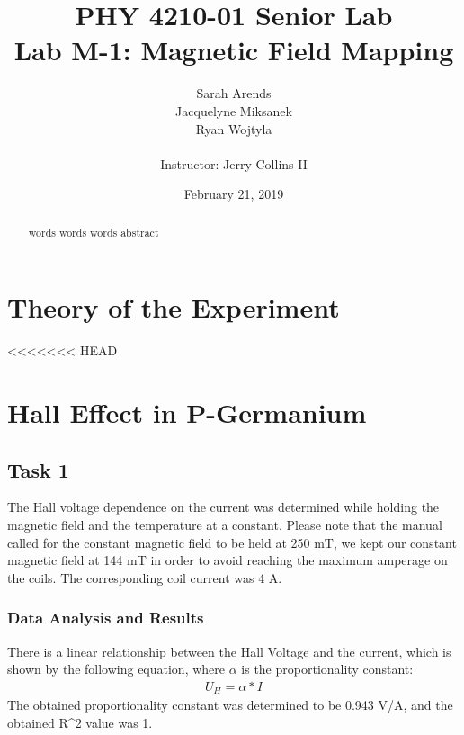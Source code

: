 \documentclass[a4paper]{article}
\title{PHY 4210-01 Senior Lab \\Lab M-1: Magnetic Field Mapping}
\author{Sarah Arends \\
        Jacquelyne Miksanek \\
        Ryan Wojtyla \\ \\
        Instructor: Jerry Collins II}
\date{February 21, 2019}
\begin{document}
\maketitle

\begin{abstract}
\qq words words words abstract
\end{abstract}

\newpage

\setcounter{tocdepth}{2}
\tableofcontents

\newpage

\section{Theory of the Experiment}

<<<<<<< HEAD

\section{Hall Effect in P-Germanium}

\subsection{Task 1}

\qq The Hall voltage dependence on the current was determined while
holding the magnetic field and the temperature at a constant. Please
note that the manual called for the constant magnetic field to be held
at 250 mT, we kept our constant magnetic field at 144 mT in order to
avoid reaching the maximum amperage on the coils. The corresponding
coil current was 4 A.

\subsubsection{Data Analysis and Results}
There is a linear relationship between the Hall Voltage and the
current, which is shown by the following equation, where $\alpha$ is
the proportionality constant:
\begin{align*}
U_H = \alpha * I
\end{align*}
The obtained proportionality constant was determined to be 0.943 V/A,
and the obtained R^2 value was 1.
\end{document}
